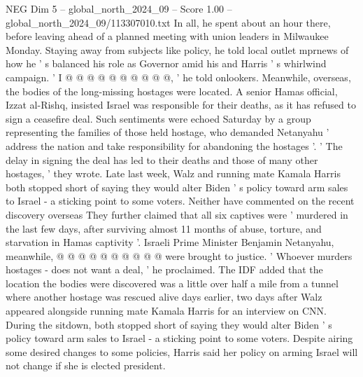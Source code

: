 \begin{textsample}{NEG Dim 5 – global\_north\_2024\_09 – Score 1.00 – global\_north\_2024\_09/113307010.txt}
In all, he spent about an hour there, before leaving ahead of a planned meeting with union leaders in Milwaukee Monday.
Staying away from subjects like policy, he told local outlet mprnews of how he ' s balanced his role as Governor amid his and Harris ' s whirlwind campaign. ' I @ @ @ @ @ @ @ @ @ @, ' he told onlookers.
Meanwhile, overseas, the bodies of the long-missing hostages were located.
A senior Hamas official, Izzat al-Rishq, insisted Israel was responsible for their deaths, as it has refused to sign a ceasefire deal.
Such sentiments were echoed Saturday by a group representing the families of those held hostage, who demanded Netanyahu ' address the nation and take responsibility for abandoning the hostages '. ' The delay in signing the deal has led to their deaths and those of many other hostages, ' they wrote.
Late last week, Walz and running mate Kamala Harris both stopped short of saying they would alter Biden ' s policy toward arm sales to Israel - a sticking point to some voters.
Neither have commented on the recent discovery overseas They further claimed that all six captives were ' murdered in the last few days, after surviving almost 11 months of abuse, torture, and starvation in Hamas captivity '.
Israeli Prime Minister Benjamin Netanyahu, meanwhile, @ @ @ @ @ @ @ @ @ @ were brought to justice. ' Whoever murders hostages - does not want a deal, ' he proclaimed.
The IDF added that the location the bodies were discovered was a little over half a mile from a tunnel where another hostage was rescued alive days earlier, two days after Walz appeared alongside running mate Kamala Harris for an interview on CNN.
During the sitdown, both stopped short of saying they would alter Biden ' s policy toward arm sales to Israel - a sticking point to some voters.
Despite airing some desired changes to some policies, Harris said her policy on arming Israel will not change if she is elected president.

\end{textsample}
